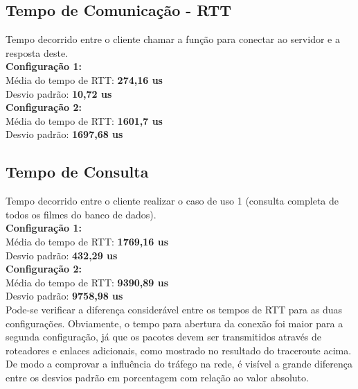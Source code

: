 \documentclass[11pt,twoside]{article}
\begin{document}
\subsection{Tempo de Comunicação - RTT}
Tempo decorrido entre o cliente chamar a função para conectar ao servidor e a resposta deste.\\
\textbf{Configuração 1: }\\
Média do tempo de RTT: \textbf{274,16 us}\\
Desvio padrão: \textbf{10,72 us}\\
\textbf{Configuração 2: }\\
Média do tempo de RTT: \textbf{1601,7 us}\\
Desvio padrão: \textbf{1697,68 us}\\

\subsection{Tempo de Consulta}
Tempo decorrido entre o cliente realizar o caso de uso 1 (consulta completa de todos os filmes do banco de dados).\\
\textbf{Configuração 1: }\\
Média do tempo de RTT: \textbf{1769,16 us}\\
Desvio padrão: \textbf{432,29 us}\\
\textbf{Configuração 2: }\\
Média do tempo de RTT: \textbf{9390,89 us}\\
Desvio padrão: \textbf{9758,98 us}\\


Pode-se verificar a diferença considerável entre os tempos de RTT para as duas configurações. Obviamente, o tempo para abertura da conexão foi maior para a segunda 
configuração, já que os pacotes devem ser transmitidos através de roteadores e enlaces adicionais, como mostrado no resultado do traceroute acima.\\
De modo a comprovar a influência do tráfego na rede, é visível a grande diferença entre os desvios padrão em porcentagem com relação ao valor absoluto.\\
\end{document}
